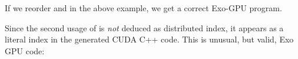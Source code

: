 

\filbreak
{}



\filbreak
{}

If we reorder  and  in the above example, we get a correct Exo-GPU program.



Since the second usage of  is \textit{not} deduced as distributed index, it appears as a literal index in the generated CUDA C++ code.
This is unusual, but valid, Exo GPU code:



\filbreak
{}




